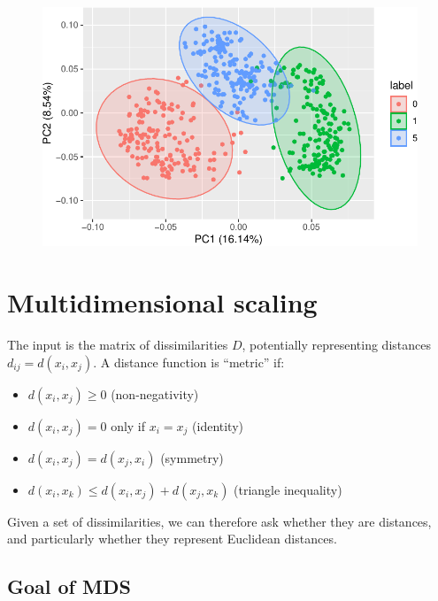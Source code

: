 \documentclass[
  letterpaper,
  DIV=11,
  numbers=noendperiod]{scrreprt}
\providecommand{\tightlist}{%
  \setlength{\itemsep}{0pt}\setlength{\parskip}{0pt}}\usepackage{longtable,booktabs,array}
\begin{document}
\begin{figure}[H]

{\centering \includegraphics{./11-SVD_PCA_files/figure-pdf/unnamed-chunk-14-1.pdf}

}

\end{figure}

\hypertarget{multidimensional-scaling}{%
\section{Multidimensional scaling}\label{multidimensional-scaling}}

The input is the matrix of dissimilarities \(D\), potentially
representing distances \(d_{ij} = d(x_i, x_j)\). A distance function is
``metric'' if:

\begin{itemize}
\tightlist
\item
  \(d(x_i, x_j) \geq 0\) (non-negativity)
\item
  \(d(x_i, x_j) = 0\) only if \(x_i = x_j\) (identity)
\item
  \(d(x_i, x_j) = d(x_j, x_i)\) (symmetry)
\item
  \(d(x_i, x_k) \leq d(x_i, x_j) + d(x_j, x_k)\) (triangle inequality)
\end{itemize}

Given a set of dissimilarities, we can therefore ask whether they are
distances, and particularly whether they represent Euclidean distances.

\hypertarget{goal-of-mds}{%
\subsection{Goal of MDS}\label{goal-of-mds}}
\end{document}
